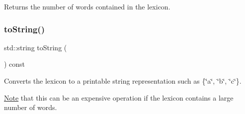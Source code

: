 Returns the number of words contained in the lexicon. 

\mbox{\label{classDawgLexicon_a1fe5121d6528fdea3f243321b3fa3a49}} 
\subsubsection{\texorpdfstring{to\+String()}{toString()}}
{\footnotesize\ttfamily std\+::string to\+String (\begin{DoxyParamCaption}{ }\end{DoxyParamCaption}) const}



Converts the lexicon to a printable string representation such as \{\char`\"{}a\char`\"{}, \char`\"{}b\char`\"{}, \char`\"{}c\char`\"{}\}. 

\mbox{\hyperlink{classNote}{Note}} that this can be an expensive operation if the lexicon contains a large number of words. 